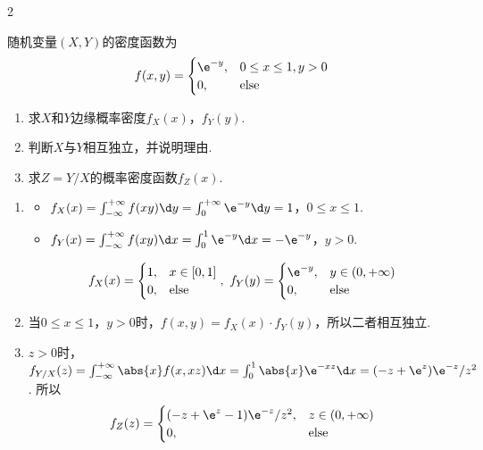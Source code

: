 \begin{paracol}{2}
\begin{problem}
    随机变量$(X,Y)$的密度函数为
    \[f(x,y)=\begin{cases}
        \e^{-y}, & 0\leq x\leq1,y>0\\
        0, & \text{else}
    \end{cases}\]
    \switchcolumn
    \begin{enumerate}
        \item 求$X$和$Y$边缘概率密度$f_X(x)$，$f_Y(y)$.
        \item 判断$X$与$Y$相互独立，并说明理由.
        \item 求$Z=Y/X$的概率密度函数$f_Z(x)$.
    \end{enumerate}
\end{problem}
\end{paracol}
\begin{solution}\leavevmode
    \begin{enumerate}
        \item 
        \begin{itemize}
            \item $f_X(x)=\int_{-\infty}^{+\infty}f(xy)\d y=\int_0^{+\infty}\e^{-y}\d y=1$，$0\leq x\leq1$.
            \item $f_Y(x)=\int_{-\infty}^{+\infty}f(xy)\d x=\int_0^1\e^{-y}\d x=-\e^{-y}$，$y>0$.
        \end{itemize}
        \[f_X(x)=\begin{cases}
            1, & x\in[0,1]\\0, & \text{else}
        \end{cases},\ f_Y(y)=\begin{cases}
            \e^{-y}, & y\in(0,+\infty)\\0, & \text{else}
        \end{cases}\]
        \item 当$0\leq x\leq1$，$y>0$时，$f(x,y)=f_X(x)\cdot f_Y(y)$，所以二者相互独立.
        \item $z>0$时，$f_{Y/X}(z)=\int_{-\infty}^{+\infty}\abs{x}f(x,xz)\d x=\int_0^1\abs{x}\e^{-xz}\d x=(-z+\e^z)\e^{-z}/z^2$. 所以
        \[f_Z(z)=\begin{cases}
            (-z+\e^z-1)\e^{-z}/z^2, & z\in(0,+\infty)\\
            0, & \text{else}
        \end{cases}\]
    \end{enumerate}
\end{solution}

